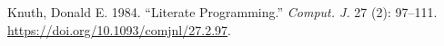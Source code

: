 \documentclass[
  letterpaper,
  DIV=11,
  numbers=noendperiod]{scrreprt}
\newlength{\cslhangindent}
\newlength{\cslentryspacingunit} %
\newenvironment{CSLReferences}[2] %
 {%
  \setlength{\parindent}{0pt}
  \ifodd #1
  \let\oldpar\par
  \def\par{\hangindent=\cslhangindent\oldpar}
  \fi
  \setlength{\parskip}{#2\cslentryspacingunit}
 }%
 {}
\begin{document}

\hypertarget{refs}{}
\begin{CSLReferences}{1}{0}
\leavevmode{}%
Knuth, Donald E. 1984. {``Literate Programming.''} \emph{Comput. J.} 27
(2): 97--111. \url{https://doi.org/10.1093/comjnl/27.2.97}.

\end{CSLReferences}



\printindex
\end{document}
